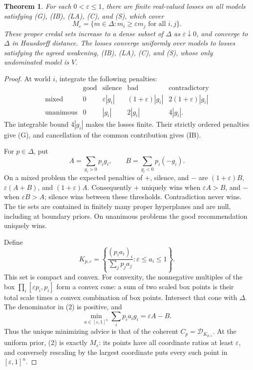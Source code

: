 \documentclass[11pt]{article}
\newtheorem{theorem}{Theorem}
\theoremstyle{remark}\newtheorem{remark}[theorem]{Remark}
\newcommand{\Dscr}{\mathcal D}
\begin{document}
\begin{theorem}\label{thm:limit}
For each $0<\varepsilon\le1$, there are finite real-valued losses on all
models satisfying (G), (IB), (LA), (C), and (S), which cover
\[
 M_\varepsilon
 =\{m\in\Delta:m_i\ge\varepsilon m_j\text{ for all }i,j\}.
\]
These proper credal sets increase to a dense subset of $\Delta$ as
$\varepsilon\downarrow0$, and converge to $\Delta$ in Hausdorff distance.
The losses converge uniformly over models to losses satisfying the agreed
weakening, (IB), (LA), (C), and (S), whose only undominated model is $V$.
\end{theorem}
\begin{proof}
At world $i$, integrate the following penalties:
\[
\begin{array}{c|cccc}
 &\text{good}&\text{silence}&\text{bad}&\text{contradictory}\\\hline
 \text{mixed}&0&\varepsilon|g_i|&(1+\varepsilon)|g_i|
     &2(1+\varepsilon)|g_i|\\
 \text{unanimous}&0&|g_i|&2|g_i|&4|g_i|.
\end{array}
\tag{1}
\]
The integrable bound $4|g_i|$ makes the losses finite. Their strictly
ordered penalties give (G), and cancellation of the common contribution
gives (IB).

For $p\in\Delta$, put
\[
 A=\sum_{g_i>0}p_i g_i,\qquad B=\sum_{g_i<0}p_i(-g_i).
\]
On a mixed problem the expected penalties of $+$, silence, and $-$ are
$(1+\varepsilon)B$, $\varepsilon(A+B)$, and $(1+\varepsilon)A$.
Consequently $+$ uniquely wins when $\varepsilon A>B$, and $-$ when
$\varepsilon B>A$; silence wins between these thresholds. Contradiction
never wins. The tie sets are contained in finitely many proper
hyperplanes and are null, including at boundary priors. On unanimous
problems the good recommendation uniquely wins.

Define
\[
 K_{p,\varepsilon}
 =\left\{\frac{(p_i a_i)_i}{\sum_jp_j a_j}:
                      \varepsilon\le a_i\le1\right\}.
\tag{2}
\]
This set is compact and convex. For convexity, the nonnegative multiples
of the box $\prod_i[\varepsilon p_i,p_i]$ form a convex cone: a sum of
two scaled box points is their total scale times a convex combination
of box points. Intersect that cone with $\Delta$.
The denominator in (2) is positive, and
\[
 \min_{a\in[\varepsilon,1]^n}\sum_i p_i a_i g_i
       =\varepsilon A-B.
\]
Thus the unique minimizing advice is that of the coherent
$C_p=\Dscr_{K_{p,\varepsilon}}$. At the uniform prior, (2) is exactly
$M_\varepsilon$: its points have all coordinate ratios at least
$\varepsilon$, and conversely rescaling by the largest coordinate puts
every such point in $[\varepsilon,1]^n$.


\end{proof}
\end{document}

